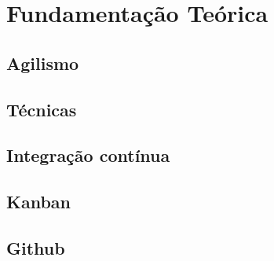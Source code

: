 \chapter{Fundamentação Teórica}

\section{Agilismo}

\section{Técnicas}

\section{Integração contínua}

\section{Kanban}

\section{Github}
